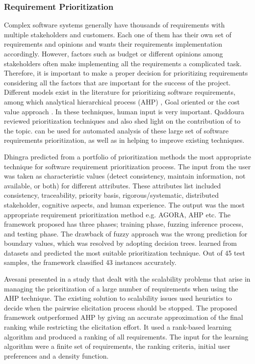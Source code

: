 \subsubsection{Requirement Prioritization}
Complex software systems generally have thousands of requirements with multiple
stakeholders and customers. Each one of them has their own set of requirements
and opinions and wants their requirements implementation accordingly. However,
factors such as budget or different opinions among stakeholders often make
implementing all the requirements a complicated task. Therefore, it is
important to make a proper decision for prioritizing requirements considering
all the factors that are important for the success of the project. Different
models exist in the literature for prioritizing software requirements, among
which analytical hierarchical process (AHP) \cite{saaty2008}, Goal oriented
\cite{VanLamsweerde:2001} or the cost value approach \cite{Karlsson:1997}. In
these techniques, human input is very important. Qaddoura \etal
\cite{R.Qaddoura} reviewed  prioritization techniques and also shed light on the
contribution of \ML to the topic. \ML can be used for automated analysis of
these large set of software requirements prioritization, as well as in helping
to improve existing techniques.

Dhingra \etal  \cite{S.Dhingra} predicted from a portfolio of prioritization
methods the most appropriate technique for software requirement prioritization
process. The input from the user was taken as characteristic values (detect
consistency, maintain information, not available, or both) for different attributes. These attributes list included
consistency, traceability, priority basis, rigorous/systematic, distributed
stakeholder, cognitive aspects, and human experience. The output was the most
appropriate requirement prioritization method e.g. AGORA, AHP etc. The
framework proposed has three phases; training phase, fuzzing inference
process, and testing phase. The drawback of fuzzy approach was the wrong prediction for
boundary values, which was resolved by adopting decision trees. \DT learned
from datasets and predicted the most suitable prioritization technique. Out of
45 test samples, the framework classified 43 instances accurately.

Avesani \etal presented in \cite{PAvesani} a study that dealt with the
scalability problems that arise in managing the prioritization of a large number
of requirements when using the AHP technique. The existing solution to
scalability issues used heuristics to decide when the pairwise elicitation
process should be stopped. The proposed framework outperformed AHP by giving an
accurate approximation of the final ranking while restricting the elicitation
effort. It used a rank-based learning algorithm and produced a ranking of all
requirements. The input for the learning algorithm were a finite set
of requirements, the ranking criteria, initial user preferences and a density
function.

